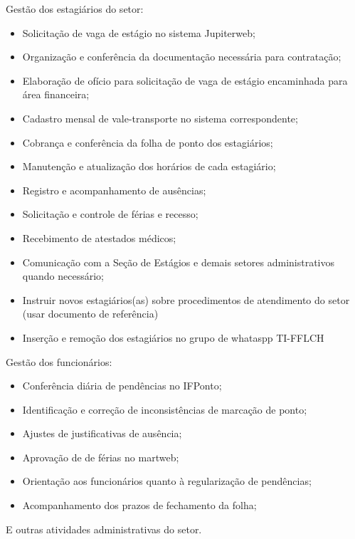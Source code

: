 Gestão dos estagiários do setor:
\bigskip\begin{itemize} 
    \item Solicitação de vaga de estágio no sistema Jupiterweb; 
    \item Organização e conferência da documentação necessária para contratação; 
    \item Elaboração de ofício para solicitação de vaga de estágio encaminhada para área financeira; 
    \item Cadastro mensal de vale-transporte no sistema correspondente; 
    \item Cobrança e conferência da folha de ponto dos estagiários; 
    \item Manutenção e atualização dos horários de cada estagiário; 
    \item Registro e acompanhamento de ausências; 
    \item Solicitação e controle de férias e recesso; 
    \item Recebimento de atestados médicos; 
    \item Comunicação com a Seção de Estágios e demais setores administrativos quando necessário; 
    \item Instruir novos estagiários(as) sobre procedimentos de atendimento do setor (usar documento de referência) 
    \item Inserção e remoção dos estagiários no grupo de whataspp TI-FFLCH 
\end{itemize}

Gestão dos funcionários:
\bigskip\begin{itemize} 
    \item Conferência diária de pendências no IFPonto; 
    \item Identificação e correção de inconsistências de marcação de ponto; 
    \item Ajustes de justificativas de ausência; 
    \item Aprovação de de férias no martweb; 
    \item Orientação aos funcionários quanto à regularização de pendências; 
    \item Acompanhamento dos prazos de fechamento da folha;
\end{itemize}

E outras atividades administrativas do setor. 